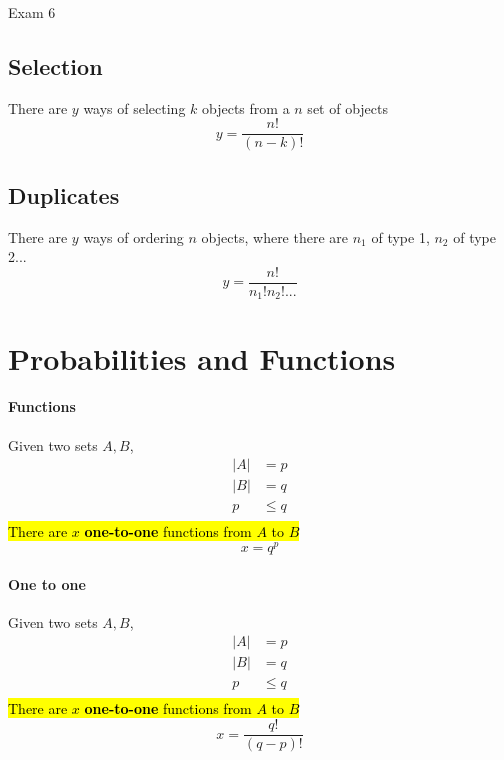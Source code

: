 \documentclass{note}
\begin{document}
\begin{note}{Exam 6}
        \subsection{Selection}

        There are $ y $ ways of selecting $ k $ objects from a $ n $ set of objects
        \begin{equation}\label{eq: select permutations}
            y = \frac{n !}{\left( n - k\right)!}
        \end{equation}

        \subsection{Duplicates}

        There are $ y $ ways of ordering $ n $ objects, where there are $ n_{1} $ of type 1, $ n_{2} $ of type 2...
        \begin{equation}\label{eq: duplicate permutation}
            y = \frac{n !}{n_{1}! n_{2}!...}
        \end{equation}

        \section{Probabilities and Functions}

        \paragraph{Functions}
        Given two sets $ A, B $,
        \begin{align*}
            \left| A \right| &= p\\
            \left| B \right| &= q\\
            p &\leq q\\
        \end{align*}
        \hl{There are $ x $ \textbf{one-to-one} functions from $ A $ to $ B $}
        \begin{displaymath}
            x = q^{p}
        \end{displaymath}

        \paragraph{One to one}
        Given two sets $ A, B $,
        \begin{align*}
            \left| A \right| &= p\\
            \left| B \right| &= q\\
            p &\leq q\\
        \end{align*}
        \hl{There are $ x $ \textbf{one-to-one} functions from $ A $ to $ B $}
        \begin{displaymath}
            x = \frac{q!}{\left(q - p\right)!}
        \end{displaymath}


\end{note}
\end{document}
